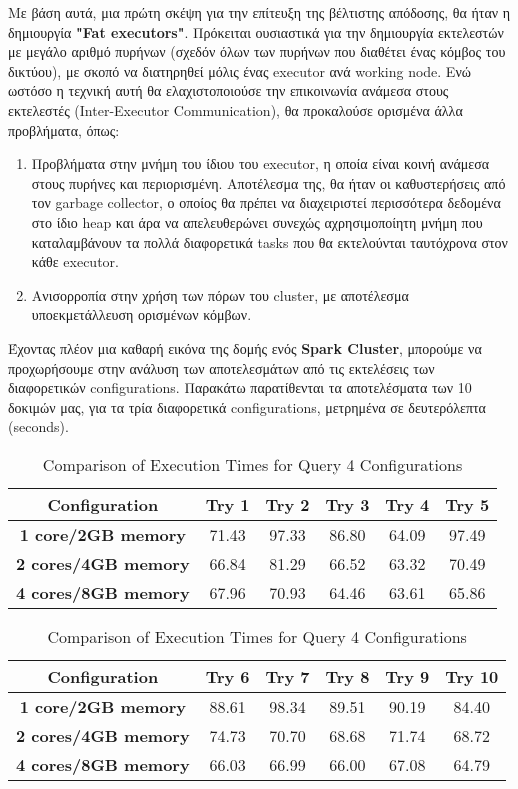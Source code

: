 \documentclass{article}
\begin{document}
Με βάση αυτά, μια πρώτη σκέψη για την επίτευξη της βέλτιστης απόδοσης, θα ήταν η δημιουργία \textbf{"Fat executors"}. Πρόκειται ουσιαστικά για την δημιουργία εκτελεστών με μεγάλο αριθμό πυρήνων (σχεδόν όλων των πυρήνων που διαθέτει ένας κόμβος του δικτύου), με σκοπό να διατηρηθεί μόλις ένας executor ανά working node. Ενώ ωστόσο η τεχνική αυτή θα ελαχιστοποιούσε την επικοινωνία ανάμεσα στους εκτελεστές (Inter-Executor Communication), θα προκαλούσε ορισμένα άλλα προβλήματα, όπως: 
\begin{enumerate}
\item Προβλήματα στην μνήμη του ίδιου του executor, η οποία είναι κοινή ανάμεσα στους πυρήνες και περιορισμένη. Aποτέλεσμα της, θα ήταν οι καθυστερήσεις από τον garbage collector, ο οποίος θα πρέπει να διαχειριστεί περισσότερα δεδομένα στο ίδιο heap και άρα να απελευθερώνει συνεχώς αχρησιμοποίητη μνήμη που καταλαμβάνουν τα πολλά διαφορετικά tasks που θα εκτελούνται ταυτόχρονα στον κάθε executor. 
\item Ανισορροπία στην χρήση των πόρων του cluster, με αποτέλεσμα υποεκμετάλλευση ορισμένων κόμβων. 
\end{enumerate}
Έχοντας πλέον μια καθαρή εικόνα της δομής ενός \textbf{Spark Cluster}, μπορούμε να προχωρήσουμε στην ανάλυση των αποτελεσμάτων από τις εκτελέσεις των διαφορετικών configurations. 
Παρακάτω παρατίθενται τα αποτελέσματα των 10 δοκιμών μας, για τα τρία διαφορετικά configurations, μετρημένα σε δευτερόλεπτα (seconds).
\begin{table}[H]
\centering
\caption{Comparison of Execution Times for Query 4 Configurations}
\label{tab:query4_execution_times}
\begin{tabular}{|c|c|c|c|c|c|}
\hline
\textbf{Configuration}           & \textbf{Try 1} & \textbf{Try 2} & \textbf{Try 3} & \textbf{Try 4}  & \textbf{Try 5}\\ \hline
\textbf{1 core/2GB memory}        &	71.43	&	97.33	&	86.80	&	64.09	&	97.49	\\ \hline
\textbf{2 cores/4GB memory}      &	66.84	&	81.29	&	66.52	&	63.32	&	70.49	\\ \hline
\textbf{4 cores/8GB memory}      & 	67.96	&	70.93	&	64.46	&	63.61	&	65.86	\\ \hline
\end{tabular}

\vspace{0.5cm}

\begin{tabular}{|c|c|c|c|c|c|}
\hline
\textbf{Configuration}           & \textbf{Try 6} & \textbf{Try 7} & \textbf{Try 8} & \textbf{Try 9} & \textbf{Try 10} \\ \hline
\textbf{1 core/2GB memory}        &	88.61	&	98.34	&	89.51	&	90.19	&	84.40	\\ \hline
\textbf{2 cores/4GB memory}      &	74.73	&	70.70	&	68.68	&	71.74	&	68.72	\\ \hline
\textbf{4 cores/8GB memory}      &	66.03	&	66.99	&	66.00	&	67.08	&	64.79	\\ \hline
\end{tabular}
\end{table}
\end{document}
